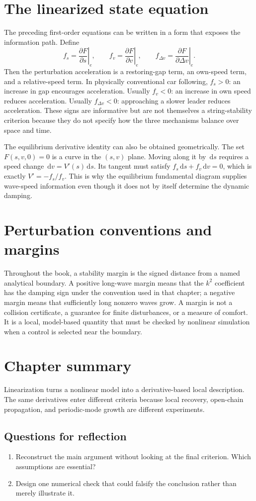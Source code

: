 \documentclass[11pt,a4paper,openany]{book}
\numberwithin{equation}{chapter}
\numberwithin{figure}{chapter}
\numberwithin{table}{chapter}
\newcommand{\chapterend}[1]{\section*{Chapter summary}\addcontentsline{toc}{section}{Chapter summary}\begin{tcolorbox}[resultbox]#1\end{tcolorbox}\subsection*{Questions for reflection}\begin{enumerate}[leftmargin=1.7em]\item Reconstruct the main argument without looking at the final criterion. Which assumptions are essential?\item Design one numerical check that could falsify the conclusion rather than merely illustrate it.\end{enumerate}\clearpage}
\newcommand{\dd}{\,\mathrm{d}}
\begin{document}
\section{The linearized state equation}
The preceding first-order equations can be written in a form that exposes the information path. Define
\begin{equation}
f_s=\left.\frac{\partial F}{\partial s}\right|_e,\qquad
f_v=\left.\frac{\partial F}{\partial v}\right|_e,\qquad
f_{\Delta v}=\left.\frac{\partial F}{\partial \Delta v}\right|_e.
\end{equation}
Then the perturbation acceleration is a restoring-gap term, an own-speed term, and a relative-speed term. In physically conventional car following, $f_s>0$: an increase in gap encourages acceleration. Usually $f_v<0$: an increase in own speed reduces acceleration. Usually $f_{\Delta v}<0$: approaching a slower leader reduces acceleration. These signs are informative but are not themselves a string-stability criterion because they do not specify how the three mechanisms balance over space and time.

The equilibrium derivative identity can also be obtained geometrically. The set $F(s,v,0)=0$ is a curve in the $(s,v)$ plane. Moving along it by $\dd s$ requires a speed change $\dd v=V'(s)\dd s$. Its tangent must satisfy $f_s\dd s+f_v\dd v=0$, which is exactly $V'=-f_s/f_v$. This is why the equilibrium fundamental diagram supplies wave-speed information even though it does not by itself determine the dynamic damping.

\section{Perturbation conventions and margins}
Throughout the book, a stability margin is the signed distance from a named analytical boundary. A positive long-wave margin means that the $k^2$ coefficient has the damping sign under the convention used in that chapter; a negative margin means that sufficiently long nonzero waves grow. A margin is not a collision certificate, a guarantee for finite disturbances, or a measure of comfort. It is a local, model-based quantity that must be checked by nonlinear simulation when a control is selected near the boundary.

\chapterend{Linearization turns a nonlinear model into a derivative-based local description. The same derivatives enter different criteria because local recovery, open-chain propagation, and periodic-mode growth are different experiments.}
\end{document}
